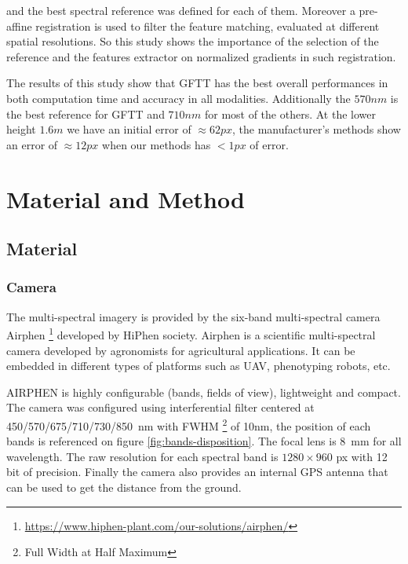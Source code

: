 \documentclass[]{elsarticle}
\begin{document}
	and the best spectral reference was defined for each of them.
	Moreover a pre-affine registration is used to filter the feature matching, evaluated at different spatial resolutions.
	So this study shows the importance of the selection of the reference and the features extractor on normalized gradients in such registration.
	\\
	\par The results of this study show that GFTT has the best overall performances in both computation time and accuracy in all modalities.
	Additionally the $570nm$ is the best reference for GFTT and $710nm$ for most of the others.
	At the lower height $1.6m$ we have an initial error of $\approx 62 px$,
	the manufacturer's methods show an error of $\approx 12 px$ when our methods has $<1px$ of error.
	
	\newpage
	\section{Material and Method}
	
	\subsection{Material}
	\subsubsection{Camera}
	
	The multi-spectral imagery is provided by the six-band multi-spectral camera Airphen \footnote{\url{https://www.hiphen-plant.com/our-solutions/airphen/}}
	developed by HiPhen society.
	Airphen is a scientific multi-spectral camera developed by agronomists for agricultural applications.
	It can be embedded in different types of platforms such as UAV, phenotyping robots, etc.
	\\
	\par AIRPHEN is highly configurable (bands, fields of view), lightweight and compact.
	The camera was configured using interferential filter centered at 450/570/675/710/730/\SI{850}{\nano\meter}
	with FWHM \footnote{Full Width at Half Maximum} of 10nm, the position of each bands is referenced on figure \ref{fig:bands-disposition}.
	The focal lens is \SI{8}{\milli\meter} for all wavelength. The raw resolution for each spectral band is $1280 \times 960$ px with 12 bit of precision.
	Finally the camera also provides an internal GPS antenna that can be used to get the distance from the ground.
	
\end{document}

